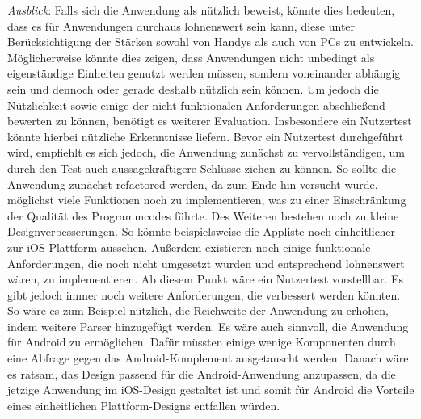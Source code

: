\newline%
\myNewSection
\textit{Ausblick}:
		Falls sich die Anwendung als nützlich beweist, könnte dies bedeuten, dass es für Anwendungen durchaus lohnenswert sein kann, diese unter Berücksichtigung der Stärken sowohl von Handys als auch von PCs zu entwickeln. Möglicherweise könnte dies zeigen, dass Anwendungen nicht unbedingt als eigenständige Einheiten genutzt werden müssen, sondern voneinander abhängig sein und dennoch oder gerade deshalb nützlich sein können.
	\newline%
		Um jedoch die Nützlichkeit sowie einige der nicht funktionalen Anforderungen abschließend bewerten zu können, benötigt es weiterer Evaluation. Insbesondere ein Nutzertest könnte hierbei nützliche Erkenntnisse liefern.
	\newline%
	Bevor ein Nutzertest durchgeführt wird, empfiehlt es sich jedoch, die Anwendung zunächst zu vervollständigen, um durch den Test auch aussagekräftigere Schlüsse ziehen zu können.	
		So sollte die Anwendung zunächst \glqq refactored\grqq{} werden, da zum Ende hin versucht wurde, möglichst viele Funktionen noch zu implementieren, was zu einer Einschränkung der Qualität des Programmcodes führte.
		Des Weiteren bestehen noch zu kleine Designverbesserungen. So könnte beispielsweise die Appliste noch einheitlicher zur iOS-Plattform aussehen.
		Außerdem existieren noch einige funktionale Anforderungen, die noch nicht umgesetzt wurden und entsprechend lohnenswert wären, zu implementieren.
	\newline%
	Ab diesem Punkt wäre ein Nutzertest vorstellbar. Es gibt jedoch immer noch weitere Anforderungen, die verbessert werden könnten.
		So wäre es zum Beispiel nützlich, die Reichweite der Anwendung zu erhöhen, indem weitere Parser hinzugefügt werden.
		Es wäre auch sinnvoll, die Anwendung für Android zu ermöglichen. Dafür müssten einige wenige Komponenten durch eine Abfrage gegen das Android-Komplement ausgetauscht werden. Danach wäre es ratsam, das Design passend für die Android-Anwendung anzupassen, da die jetzige Anwendung im iOS-Design gestaltet ist und somit für Android die Vorteile eines einheitlichen Plattform-Designs entfallen würden.
%
%
%